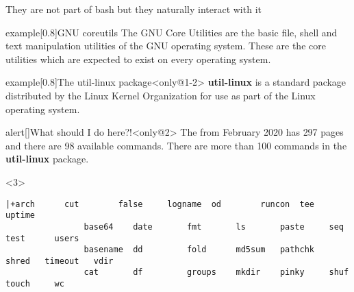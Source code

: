 
\begin{frame}[fragile]{They are not part of bash but they naturally interact with it}
    \vspace{-3mm}
    \begin{varblock}{example}[0.8\textwidth]{GNU coreutils}
        The GNU Core Utilities are the basic file, shell and text manipulation utilities of the GNU operating system.
        These are the core utilities which are expected to exist on every operating system.
    \end{varblock}
    \begin{overlayarea}{\textwidth}{0.6\textheight}
        \begin{varblock}{example}[0.8\textwidth]{The util-linux package}<only@1-2>
            \textbf{util-linux} is a standard package distributed by the Linux Kernel Organization for use as part of the Linux operating system.
        \end{varblock}
        \begin{varblock}{alert}[\textwidth]{What should I do here?!}<only@2>
            The  from February 2020 has \alert{297 pages} and there are \alert{98 available commands}.
            There are more than \alert{100 commands} in the \textbf{util-linux} package.
        \end{varblock}
        \begin{onlyenv}<3>
            \begin{lstlisting}[style=myBash, style=smaller, numbers=none, aboveskip=1mm]
                |+arch      cut        false     logname  od        runcon  tee       uptime
                base64    date       fmt       ls       paste     seq     test      users
                basename  dd         fold      md5sum   pathchk   shred   timeout   vdir
                cat       df         groups    mkdir    pinky     shuf    touch     wc

\end{lstlisting}
\end{onlyenv}
\end{overlayarea}
\end{frame}
